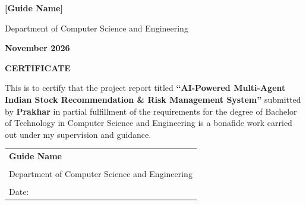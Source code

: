 \documentclass[12pt,a4paper]{report}
\begin{document}
\begin{titlepage}
    \vspace{0.5cm}
    
    {\fontsize{14}{16.8}\bfseries [Guide Name]\par}
    
    \vspace{1cm}
    
    {\fontsize{12}{14.4}\selectfont Department of Computer Science and Engineering\par}
    
    \vspace{0.5cm}
    
    {\fontsize{12}{14.4}\par}
    
    \vfill
    
    {\fontsize{14}{16.8}\bfseries November 2026\par}
\end{titlepage}

\newpage
\thispagestyle{empty}
\vspace*{3cm}
\begin{center}
    {\fontsize{16}{19.2}\bfseries CERTIFICATE\par}
\end{center}
\vspace{1.5cm}

\noindent This is to certify that the project report titled \textbf{``AI-Powered Multi-Agent Indian Stock Recommendation \& Risk Management System''} submitted by \textbf{Prakhar} in partial fulfillment of the requirements for the degree of Bachelor of Technology in Computer Science and Engineering is a bonafide work carried out under my supervision and guidance.

\vspace{2cm}

\begin{flushright}
    \begin{tabular}{@{}l@{}}
        \textbf{Guide Name} \\
        [Designation] \\
        Department of Computer Science and Engineering \\
        [Institute Name] \\
        Date: \underline{\hspace{4cm}}
    \end{tabular}
\end{flushright}
\end{document}

